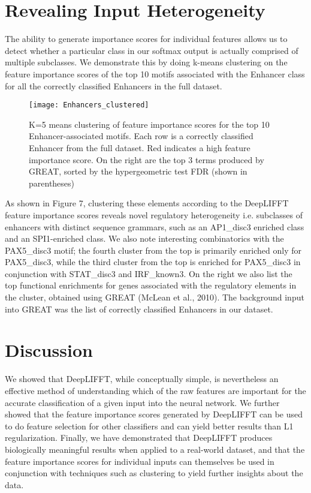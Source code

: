 \documentclass{article}
\begin{document}
\section{Revealing Input Heterogeneity}

The ability to generate importance scores for individual features allows us to detect whether a particular class in our softmax output is actually comprised of multiple subclasses. We demonstrate this by doing k-means clustering on the feature importance scores of the top 10 motifs associated with the Enhancer class for all the correctly classified Enhancers in the full dataset.
\begin{figure}[!htb]
\begin{center}
\centerline{\texttt{[image: Enhancers\_clustered]}}
\caption{K=5 means clustering of feature importance scores for the top 10 Enhancer-associated motifs. Each row is a correctly classified Enhancer from the full dataset. Red indicates a high feature importance score. On the right are the top 3 terms produced by GREAT, sorted by the hypergeometric test FDR (shown in parentheses)}
\label{rfChart}
\end{center}
\end{figure} 
As shown in Figure 7, clustering these elements according to the DeepLIFFT feature importance scores reveals novel regulatory heterogeneity i.e. subclasses of enhancers with distinct sequence grammars,
such as an AP1\_disc3 enriched class and an SPI1-enriched class. We also note interesting combinatorics with the PAX5\_disc3 motif; the fourth cluster from the top is primarily enriched only for PAX5\_disc3, while the third cluster from the top is enriched for PAX5\_disc3 in conjunction with STAT\_disc3 and IRF\_known3. On the right we also list the top functional enrichments for genes associated with the regulatory elements in the cluster, obtained using GREAT (McLean et al., 2010). The background input into GREAT was the list of correctly classified Enhancers in our dataset.



\section{Discussion}

We showed that DeepLIFFT, while conceptually simple, is nevertheless an effective method of understanding which of the raw features are important for the accurate classification of a given input into the neural network. We further showed that the feature importance scores generated by DeepLIFFT can be used to do feature selection for other classifiers and can yield better results than L1 regularization. Finally, we have demonstrated that DeepLIFFT produces biologically meaningful results when applied to a real-world dataset, and that the feature importance scores for individual inputs can themselves be used in conjunction with techniques such as clustering to yield further insights about the data.
\end{document}
